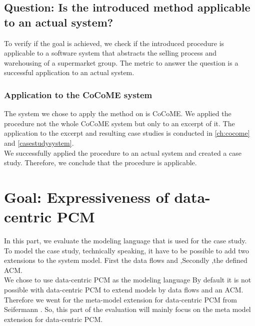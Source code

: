 \subsection{Question: Is the introduced method applicable to an actual system?}
To verify if the goal is achieved, we check if the introduced procedure is applicable to a software system that abstracts the selling process and warehousing of a supermarket group. The metric to answer the question is a successful application to an actual system.  
\subsubsection{Application to the CoCoME system}
The system we chose to apply the method on is CoCoME. We applied the procedure not the whole CoCoME system but only to an excerpt of it. The application to the excerpt and resulting case studies is conducted in \autoref{ch:cocome} and \autoref{casestudysystem}.\\ We successfully applied the procedure to an actual system and created a case study. Therefore, we conclude that the procedure is applicable.


\section{Goal: Expressiveness of data-centric PCM}
In this part, we evaluate the modeling language that is used for the case study. To model the case study, technically speaking, it have to be possible to add two extensions to the system model. First the data flows and ,Secondly ,the defined ACM.\\ We chose to use data-centric PCM as the modeling language %
By default it is not possible with data-centric PCM to extend models by data flows and an ACM. Therefore we went for the meta-model extension for data-centric PCM from Seifermann \cite{MMextension}. So, this part of the evaluation will mainly focus on the meta model extension for data-centric PCM. 

